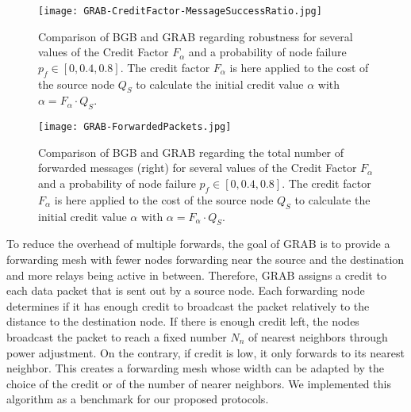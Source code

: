 \documentclass[journal, peerreview, onecolumn, draftcls]{IEEEtran}
\begin{document}
\begin{figure}
    \centering
  \texttt{[image: GRAB-CreditFactor-MessageSuccessRatio.jpg]}
    \caption{Comparison of BGB and GRAB regarding robustness for several values of the Credit Factor $F_\alpha$ and a probability of node failure $p_f\in[0,0.4,0.8]$. The credit factor $F_\alpha$ is here applied to the cost of the source node $Q_S$ to calculate the initial credit value $\alpha$ with $\alpha = F_\alpha \cdot Q_S$.}
    \label{fig:Grab-BGrab-Rob}
\end{figure}

\begin{figure}
    \centering
    \texttt{[image: GRAB-ForwardedPackets.jpg]}
    \caption{Comparison of BGB and GRAB regarding the total number of forwarded messages (right) for several values of the Credit Factor $F_\alpha$ and a probability of node failure $p_f\in[0,0.4,0.8]$. The credit factor $F_\alpha$ is here applied to the cost of the source node $Q_S$ to calculate the initial credit value $\alpha$ with $\alpha = F_\alpha \cdot Q_S$.}
    \label{fig:Grab-BGrab-For}
\end{figure}

To reduce the overhead of multiple forwards, the goal of GRAB is to provide a forwarding mesh with fewer nodes forwarding near the source and the destination and more relays being active in between. Therefore, GRAB assigns a credit to each data packet that is sent out by a source node. Each forwarding node determines if it has enough credit to broadcast the packet relatively to the distance to the destination node. If there is enough credit left, the nodes broadcast the packet to reach a fixed number $N_n$ of nearest neighbors through power adjustment. On the contrary, if credit is low, it only forwards to its nearest neighbor. This creates a forwarding mesh whose width can be adapted by the choice of the credit or of the number of nearer neighbors. We implemented this algorithm as a benchmark for our proposed protocols.
\end{document}
